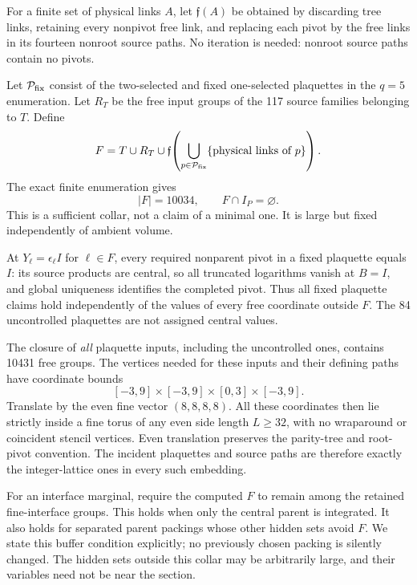 \documentclass[11pt,oneside]{article}
\begin{document}
For a finite set of physical links \(A\),
let \(\mathfrak f(A)\) be obtained by
discarding tree links, retaining every
nonpivot free link, and replacing each pivot
by the free links in its fourteen nonroot
source paths. No iteration is needed:
nonroot source paths contain no pivots.

Let \(\mathcal P_{\rm fix}\) consist of the
two-selected and fixed one-selected
plaquettes in the \(q=5\) enumeration.
Let \(R_T\) be the free input groups of the
117 source families belonging to \(T\).
Define
\begin{equation}\label{eq:f13v14-collar}
 F=T\cup R_T\cup
       \mathfrak f\!\left(
            \bigcup_{p\in\mathcal P_{\rm fix}}\{\text{physical links of }p\}
                    \right).
\end{equation}
The exact finite enumeration gives
\[
                         |F|=10034,\qquad F\cap I_P=\varnothing .
\]
This is a sufficient collar, not a claim
of a minimal one. It is large but fixed
independently of ambient volume.

At \(Y_\ell=\epsilon_\ell I\) for
\(\ell\in F\), every required nonparent
pivot in a fixed plaquette equals \(I\):
its source products are central, so all
truncated logarithms vanish at \(B=I\),
and global uniqueness identifies the
completed pivot. Thus all fixed plaquette
claims hold independently of the values
of every free coordinate outside \(F\).
The 84 uncontrolled plaquettes are not
assigned central values.

The closure of \emph{all} plaquette inputs,
including the uncontrolled ones, contains
10431 free groups. The vertices needed for
these inputs and their defining paths have
coordinate bounds
\[
 [-3,9]\times[-3,9]\times[0,3]\times[-3,9].
\]
Translate by the even fine vector
\((8,8,8,8)\). All these coordinates then
lie strictly inside a fine torus of any
even side length \(L\ge32\), with no
wraparound or coincident stencil vertices.
Even translation preserves the parity-tree
and root-pivot convention. The incident
plaquettes and source paths are therefore
exactly the integer-lattice ones in every
such embedding.

For an interface marginal, require the
computed \(F\) to remain among the retained
fine-interface groups. This holds when only
the central parent is integrated. It also
holds for separated parent packings whose
other hidden sets avoid \(F\). We state this
buffer condition explicitly; no previously
chosen packing is silently changed. The
hidden sets outside this collar may be
arbitrarily large, and their variables
need not be near the section.
\end{document}
